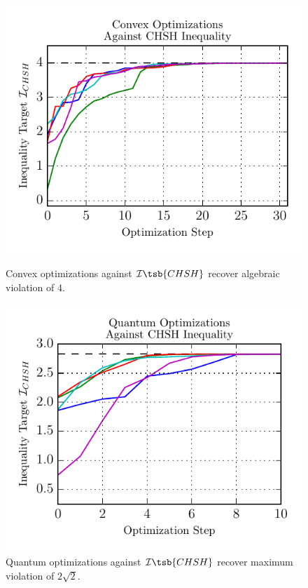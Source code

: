 \documentclass[aps, 10pt, english, twoside, pra, nofootinbib, longbibliography]{revtex4-1}
\theoremstyle{plain}
\theoremstyle{definition}
\theoremstyle{remark}
\begin{document}
    \begin{figure}
    \newlength\figureheight
    \newlength\figurewidth
    \setlength\figureheight{2.7in}
    \setlength{}
    \begin{center}
        \begin{minipage}[b]{.48\textwidth}
            \centering
            \includegraphics{figures/CHSH_convex.pdf}
            \caption{Convex optimizations against $\mathcal{I}\tsb{CHSH}$ recover algebraic violation of $4$.}
            \label{fig:CHSH_convex}
        \end{minipage}\hspace{0.04\textwidth}%
        \begin{minipage}[b]{.48\textwidth}
            \centering
            \includegraphics{figures/CHSH_quantum.pdf}
            \caption{Quantum optimizations against $\mathcal{I}\tsb{CHSH}$ recover maximum violation of $2\sqrt{2}$.}
            \label{fig:CHSH_quantum}
        \end{minipage}
    \end{center}
    \end{figure}
\end{document}
